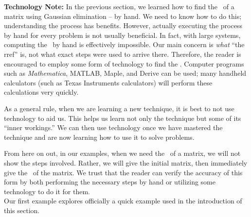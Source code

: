 \textsf{\textbf{ Technology Note:}} In the previous section, we learned how to find the \rref\ of a matrix using Gaussian elimination -- by hand. We need to know how to do this; understanding the process has benefits. However, actually executing the process by hand for every problem is not usually beneficial. In fact, with large systems, computing the \rref\ by hand is effectively impossible. Our main concern is \textit{what} ``the rref'' is, not what exact steps were used to arrive there.
Therefore, the reader is encouraged to employ some form of technology to find the \rref. Computer programs such as \textit{Mathematica}, MATLAB, Maple, and Derive can be used;
many handheld calculators (such as Texas Instruments calculators) will perform these calculations very quickly. 

As a general rule, when we are learning a new technique, it is best to not use technology to aid us. This helps us learn not only the technique but some of its ``inner workings.'' We can then use technology once we have mastered the technique and are now learning how to use it to solve problems.

From here on out, in our examples, when we need the \rref\ of a matrix, we will not show the steps involved. Rather, we will give the initial matrix, then immediately give the \rref\ of the matrix. We trust that the reader can verify the accuracy of this form by both performing the necessary steps by hand or utilizing some technology to do it for them.\\

Our first example explores officially a quick example used in the introduction of this section.

\medskip

